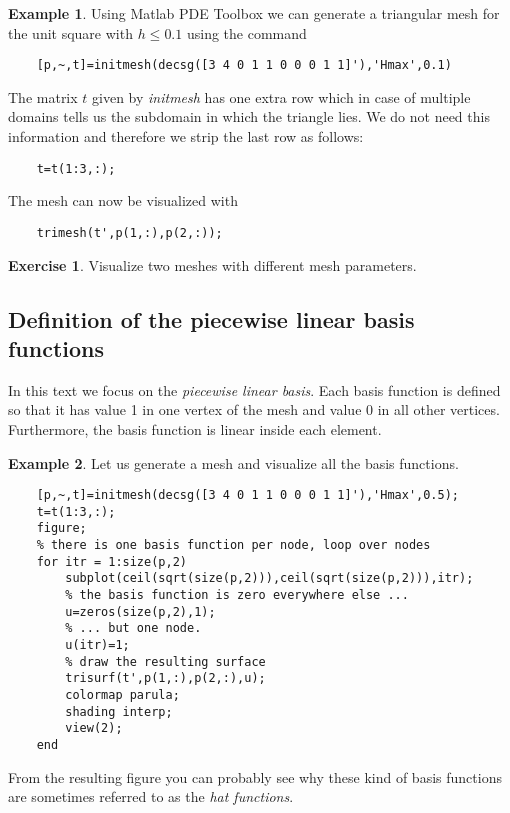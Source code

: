\documentclass{amsart}
\theoremstyle{definition}
\newtheorem{exercise}{\color{red}Exercise}
\newtheorem{example}{Example}
\begin{document}
\begin{example}
  Using Matlab PDE Toolbox we can generate a triangular mesh for the
  unit square with $h\leq 0.1$ using the command
\begin{lstlisting}
    [p,~,t]=initmesh(decsg([3 4 0 1 1 0 0 0 1 1]'),'Hmax',0.1)
\end{lstlisting}
  The matrix $t$ given by \emph{initmesh} has one extra row which
  in case of multiple domains tells us the subdomain in which the
  triangle lies. We do not need this information and therefore we
  strip the last row as follows:
\begin{lstlisting}
    t=t(1:3,:);
\end{lstlisting}
  The mesh can now be visualized with
\begin{lstlisting}
    trimesh(t',p(1,:),p(2,:));
\end{lstlisting}
\end{example}

\begin{exercise}
  Visualize two meshes with different mesh parameters.
\end{exercise}

\subsection{Definition of the piecewise linear basis functions}

In this text we focus on the \emph{piecewise linear basis}.  Each
basis function is defined so that it has value 1 in one vertex of the
mesh and value 0 in all other vertices. Furthermore, the basis
function is linear inside each element.

\begin{example}
  Let us generate a mesh and visualize all the basis functions.
  \begin{lstlisting}
    [p,~,t]=initmesh(decsg([3 4 0 1 1 0 0 0 1 1]'),'Hmax',0.5);
    t=t(1:3,:);
    figure;
    % there is one basis function per node, loop over nodes
    for itr = 1:size(p,2)
        subplot(ceil(sqrt(size(p,2))),ceil(sqrt(size(p,2))),itr);
        % the basis function is zero everywhere else ...
        u=zeros(size(p,2),1);
        % ... but one node.
        u(itr)=1;
        % draw the resulting surface
        trisurf(t',p(1,:),p(2,:),u);
        colormap parula;
        shading interp;
        view(2);
    end
  \end{lstlisting}
  From the resulting figure you can probably see why these
  kind of basis functions are sometimes referred to as
  the \emph{hat functions}.
\end{example}
\end{document}
